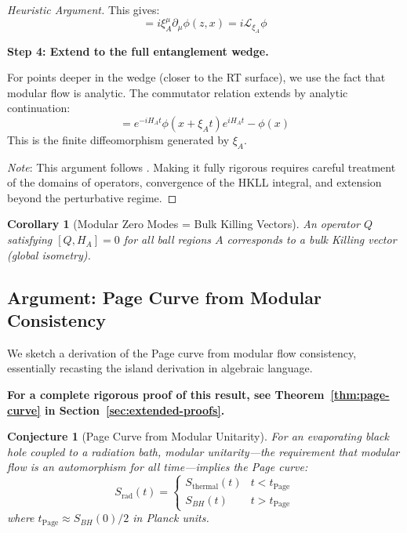 \documentclass[12pt,a4paper]{article}
\newtheorem{conjecture}[theorem]{Conjecture}
\newtheorem{corollary}[theorem]{Corollary}
\begin{document}
\begin{proof}[Heuristic Argument]
This gives:
\begin{equation}
[\phi(z, x), H_A] = i \xi_A^\mu \partial_\mu \phi(z, x) = i \mathcal{L}_{\xi_A} \phi
\end{equation}

\textbf{Step 4: Extend to the full entanglement wedge.}

For points deeper in the wedge (closer to the RT surface), we use the fact that modular flow is analytic. The commutator relation extends by analytic continuation:
\begin{equation}
[\phi(x), e^{-iH_A t}] = e^{-iH_A t} \phi(x + \xi_A t) e^{iH_A t} - \phi(x)
\end{equation}
This is the finite diffeomorphism generated by $\xi_A$.

\textit{Note}: This argument follows \cite{faulkner2017}. Making it fully rigorous requires careful treatment of the domains of operators, convergence of the HKLL integral, and extension beyond the perturbative regime.
\end{proof}

\begin{corollary}[Modular Zero Modes = Bulk Killing Vectors]
An operator $Q$ satisfying $[Q, H_A] = 0$ for all ball regions $A$ corresponds to a bulk Killing vector (global isometry).
\end{corollary}

\subsection{Argument: Page Curve from Modular Consistency}

We sketch a derivation of the Page curve from modular flow consistency, essentially recasting the island derivation in algebraic language.

\textbf{For a complete rigorous proof of this result, see Theorem~\ref{thm:page-curve} in Section~\ref{sec:extended-proofs}.}

\begin{conjecture}[Page Curve from Modular Unitarity]
For an evaporating black hole coupled to a radiation bath, modular unitarity---the requirement that modular flow is an automorphism for all time---implies the Page curve:
\begin{equation}
S_{\text{rad}}(t) = \begin{cases}
S_{\text{thermal}}(t) & t < t_{\text{Page}} \\
S_{BH}(t) & t > t_{\text{Page}}
\end{cases}
\end{equation}
where $t_{\text{Page}} \approx S_{BH}(0)/2$ in Planck units.
\end{conjecture}
\end{document}

